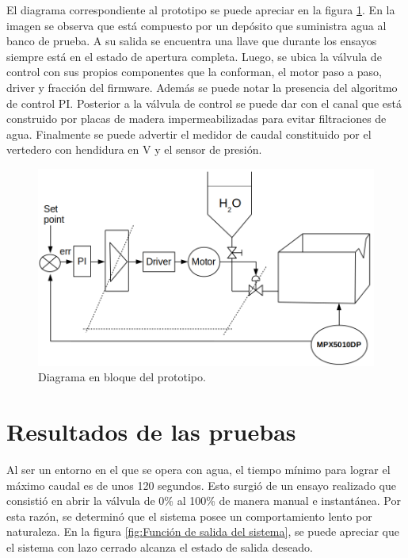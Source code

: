 El diagrama correspondiente al prototipo se puede apreciar en la figura \ref{fig:Diagrama en bloque del prototipo}. En la imagen se observa que está compuesto por un depósito que suministra agua al banco de prueba. A su salida se encuentra una llave que durante los ensayos siempre está en el estado de apertura completa. Luego, se ubica la válvula de control con sus propios componentes que la conforman, el motor paso a paso, driver y fracción del firmware. Además se puede notar la presencia del algoritmo de control PI. Posterior a la válvula de control se puede dar con el canal que está construido por placas de madera impermeabilizadas para evitar filtraciones de agua. Finalmente se puede advertir el medidor de caudal constituido por el vertedero  con hendidura en V y el sensor de presión.
\begin{figure}[h]
	\centering
	\includegraphics[scale=.60]{./Figures/Diagrama-prototipoII.png}
	\caption{Diagrama en bloque del prototipo.}
	\label{fig:Diagrama en bloque del prototipo}
\end{figure}	

\section{Resultados de las pruebas}
\label{sec:Resultados de las pruebas}
Al ser un entorno en el que se opera con agua, el tiempo mínimo para lograr el máximo caudal es de unos 120 segundos. Esto surgió de un ensayo realizado que consistió en abrir la válvula de 0\% al 100\% de manera manual e instantánea. Por esta razón, se determinó que el sistema posee un comportamiento lento por naturaleza. 
En la figura \ref{fig:Función de salida del sistema}, se puede apreciar que el sistema con lazo cerrado alcanza el estado de salida deseado. 

